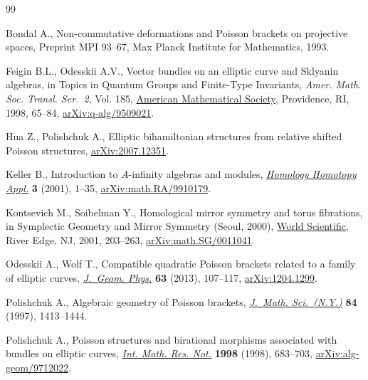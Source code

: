 \begin{thebibliography}{99}
\footnotesize\itemsep=0pt

Bondal A., Non-commutative deformations and {P}oisson brackets on projective
 spaces, {P}reprint MPI 93--67, Max Planck Institute for Mathematics, 1993.

Feigin B.L., Odesskii A.V., Vector bundles on an elliptic curve and {S}klyanin
 algebras, in Topics in Quantum Groups and Finite-Type Invariants,
 \textit{Amer. Math. Soc. Transl. Ser.~2}, Vol. 185, \href{https://doi.org/10.1090/trans2/185/04}{American Mathematical
 Society}, Providence, RI, 1998, 65--84, \href{https://arxiv.org/abs/arXiv:q-alg/9509021}{arXiv:q-alg/9509021}.

Hua Z., Polishchuk A., Elliptic bihamiltonian structures from relative shifted {P}oisson structures, \href{https://arxiv.org/abs/2007.12351}{arXiv:2007.12351}.

Keller B., Introduction to {$A$}-infinity algebras and modules,
 \href{https://doi.org/10.4310/hha.2001.v3.n1.a1}{\textit{Homology Homotopy Appl.}} \textbf{3} (2001), 1--35,
 \href{https://arxiv.org/abs/math.RA/9910179}{arXiv:math.RA/9910179}.

Kontsevich M., Soibelman Y., Homological mirror symmetry and torus fibrations,
 in Symplectic Geo\-met\-ry and Mirror Symmetry ({S}eoul, 2000), \href{https://doi.org/10.1142/9789812799821_0007}{World Scientific},
 River Edge, NJ, 2001, 203--263, \href{https://arxiv.org/abs/math.SG/0011041}{arXiv:math.SG/0011041}.

Odesskii A., Wolf T., Compatible quadratic {P}oisson brackets related to a
 family of elliptic curves, \href{https://doi.org/10.1016/j.geomphys.2012.10.004}{\textit{J.~Geom. Phys.}} \textbf{63} (2013),
 107--117, \href{https://arxiv.org/abs/1204.1299}{arXiv:1204.1299}.

Polishchuk A., Algebraic geometry of {P}oisson brackets, \href{https://doi.org/10.1007/BF02399197}{\textit{J.~Math.
 Sci.~(N.Y.)}} \textbf{84} (1997), 1413--1444.

Polishchuk A., Poisson structures and birational morphisms associated with
 bundles on elliptic curves, \href{https://doi.org/10.1155/S1073792898000415}{\textit{Int. Math. Res. Not.}} \textbf{1998}
 (1998), 683--703, \href{https://arxiv.org/abs/alg-geom/9712022}{arXiv:alg-geom/9712022}.

\end{thebibliography}
